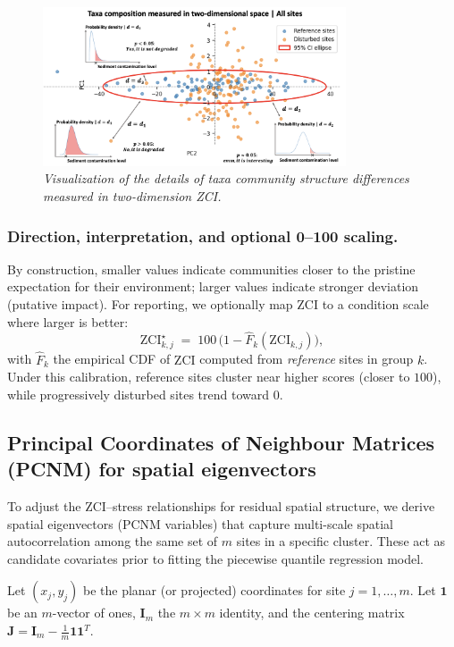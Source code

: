 \begin{figure}[!h]
\centering
\includegraphics[width=0.8\textwidth]{../presentation/figures/p18_all_sites_in_2dimensional.png}
\caption{\textit{Visualization of the details of taxa community structure differences measured in two-dimension ZCI.}}
\label{fig:p18_all_sites_in_2dimensional}
\end{figure}

\subsubsection{Direction, interpretation, and optional 0--100 scaling.}

By construction, smaller values indicate communities closer to the pristine expectation for their environment; larger values indicate stronger deviation (putative impact).
For reporting, we optionally map ZCI to a condition scale where larger is better:
\[
\mathrm{ZCI}^{\star}_{k,j} \;=\; 100\,\big(1-\widehat{F}_k(\mathrm{ZCI}_{k,j})\big),
\]
with $\widehat{F}_k$ the empirical CDF of $\mathrm{ZCI}$ computed from \emph{reference} sites in group $k$. 
Under this calibration, reference sites cluster near higher scores (closer to $100$), while progressively disturbed sites trend toward $0$.

\subsection{Principal Coordinates of Neighbour Matrices (PCNM) for spatial eigenvectors}

To adjust the ZCI--stress relationships for residual spatial structure,
we derive spatial eigenvectors (PCNM variables) that capture multi-scale spatial autocorrelation
among the same set of $m$ sites in a specific cluster. 
These act as candidate covariates prior to fitting the piecewise quantile regression model.

Let $(x_j,y_j)$ be the planar (or projected) coordinates for site $j=1,\dots,m$.
Let $\mathbf{1}$ be an $m$-vector of ones, $\mathbf{I}_m$ the $m\times m$ identity, 
and the centering matrix $\mathbf{J}=\mathbf{I}_m-\tfrac{1}{m}\mathbf{1}\mathbf{1}^T$.

